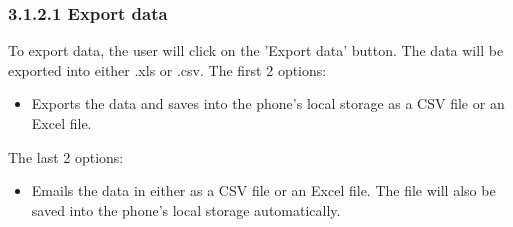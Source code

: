 \documentclass[a4paper]{scrreprt}
\begin{document}
\subsubsection{3.1.2.1 Export data}
To export data, the user will click on the 'Export data' button. The data will be exported into either .xls or .csv.
\newline
\newline
The first 2 options:
\begin{itemize}
    \item Exports the data and saves into the phone’s local storage as a CSV file or an Excel file.
\end{itemize}
The last 2 options:
\begin{itemize}
    \item Emails the data in either as a CSV file or an Excel file. The file will also be saved into the phone’s local storage automatically.
\end{itemize}
\end{document}
